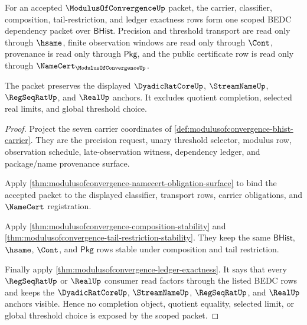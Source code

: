 \begin{theorem}\label{thm:modulusofconvergence-scoped-dependency-packet}
For an accepted $\ModulusOfConvergenceUp$ packet, the carrier, classifier,
composition, tail-restriction, and ledger exactness rows form one scoped BEDC
dependency packet over $\mathsf{BHist}$. Precision and threshold transport are
read only through $\hsame$, finite observation windows are read only through
$\Cont$, provenance is read only through $\mathsf{Pkg}$, and the public
certificate row is read only through
$\NameCert_{\ModulusOfConvergenceUp}$.

The packet preserves the displayed $\DyadicRatCoreUp$, $\StreamNameUp$,
$\RegSeqRatUp$, and $\RealUp$ anchors. It excludes quotient completion,
selected real limits, and global threshold choice.
\end{theorem}
\begin{proof}
Project the seven carrier coordinates of
\autoref{def:modulusofconvergence-bhist-carrier}. They are the precision
request, unary threshold selector, modulus row, observation schedule,
late-observation witness, dependency ledger, and package/name provenance
surface.

Apply \autoref{thm:modulusofconvergence-namecert-obligation-surface} to bind
the accepted packet to the displayed classifier, transport rows, carrier
obligations, and $\NameCert$ registration.

Apply \autoref{thm:modulusofconvergence-composition-stability} and
\autoref{thm:modulusofconvergence-tail-restriction-stability}. They keep the
same $\mathsf{BHist}$, $\hsame$, $\Cont$, and $\mathsf{Pkg}$ rows stable under
composition and tail restriction.

Finally apply \autoref{thm:modulusofconvergence-ledger-exactness}. It says
that every $\RegSeqRatUp$ or $\RealUp$ consumer read factors through the
listed BEDC rows and keeps the $\DyadicRatCoreUp$, $\StreamNameUp$,
$\RegSeqRatUp$, and $\RealUp$ anchors visible. Hence no completion object,
quotient equality, selected limit, or global threshold choice is exposed by the
scoped packet.
\end{proof}

